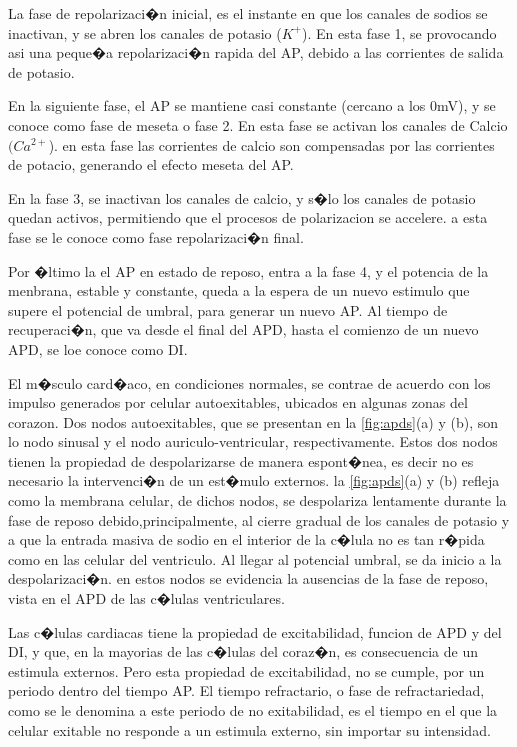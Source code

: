La  fase de repolarizaci�n inicial, es el instante en que los canales de sodios
se inactivan, y se abren los canales de potasio ($K^+$). En esta fase 1, se
provocando asi una peque�a repolarizaci�n rapida del \ac{AP}, debido a las corrientes de
salida de potasio.

En la siguiente fase, el \ac{AP} se mantiene casi constante (cercano a los 
0mV), y se conoce como fase de meseta o fase 2. En esta fase se activan los
canales de Calcio $(Ca^{2+}$). en esta fase las corrientes de calcio 
son compensadas por las corrientes de potacio, generando el efecto meseta del
\ac{AP}.

En la fase 3, se inactivan los canales de calcio, y s�lo los canales de
potasio quedan activos, permitiendo que el procesos de polarizacion se
accelere. a esta fase se le conoce como fase repolarizaci�n final.

Por �ltimo la el \ac{AP} en estado de reposo, entra a la fase 4, y el potencia
de la menbrana, estable y constante, queda a la espera de un nuevo estimulo que
supere el potencial de umbral, para generar un nuevo \ac{AP}. Al tiempo de
recuperaci�n, que va desde el final del \ac{APD}, hasta el comienzo de un nuevo
\ac{APD}, se loe conoce como \ac{DI}.


El m�sculo card�aco, en condiciones normales, se contrae de acuerdo con los
impulso generados por celular autoexitables, ubicados en algunas zonas del corazon. Dos
nodos autoexitables, que se presentan en la \ref{fig:apds}(a) y (b), son lo 
nodo sinusal y el nodo auriculo-ventricular, respectivamente. Estos dos nodos
tienen la propiedad de despolarizarse de manera espont�nea, es decir no es
necesario la intervenci�n de un est�mulo externos. la \ref{fig:apds}(a) y (b)
refleja como la membrana celular, de dichos nodos,  se despolariza lentamente
durante la fase de reposo debido,principalmente, al cierre gradual de los
canales de potasio y a que la entrada masiva de sodio en el interior de la
c�lula no es tan r�pida como en las celular del ventriculo. Al llegar al
potencial umbral, se da inicio a la despolarizaci�n. en estos nodos se evidencia
la ausencias de la fase de reposo, vista en el \ac{APD} de las c�lulas ventriculares. 


Las c�lulas cardiacas tiene la propiedad de excitabilidad, funcion de \ac{APD}
y del \ac{DI}, y que, en la mayorias de las c�lulas del coraz�n, es
consecuencia de un estimula externos. Pero esta propiedad  de excitabilidad, no
se cumple, por un periodo dentro del tiempo \ac{AP}. El tiempo refractario, o
fase de refractariedad, como se le denomina a este periodo de no exitabilidad,
es el tiempo en el que la celular exitable no responde a un estimula externo,
sin importar su intensidad. 

